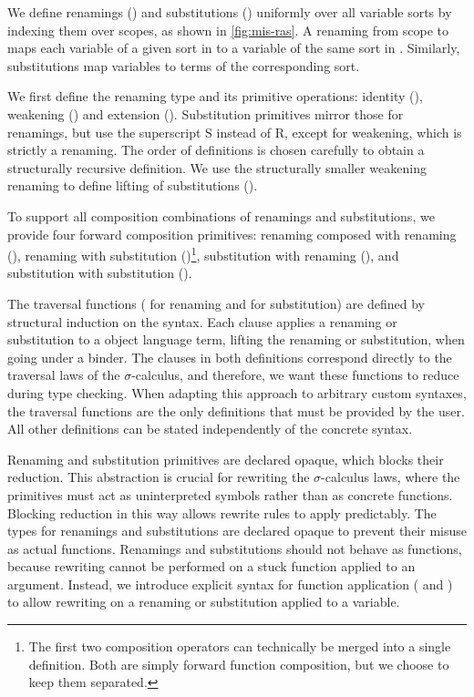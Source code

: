 \documentclass[screen,nonacm]{acmart}
\begin{document}
We define renamings () and substitutions
() uniformly over all variable sorts by indexing them over
scopes, as shown in \cref{fig:mis-ras}. A renaming from scope  to
 maps each variable of a given sort in  to a
variable of the same sort in . Similarly, substitutions map
variables to terms of the corresponding sort.

We first define the renaming type and its primitive operations: identity
(), weakening () and extension
(). Substitution primitives mirror those for renamings,
but use the superscript S instead of R, except for weakening, which is strictly
a renaming. The order of definitions is chosen carefully to obtain a
structurally recursive definition. We use the structurally smaller weakening
renaming to define lifting of substitutions ().

To support all composition combinations of renamings and substitutions, we
provide four forward composition primitives: renaming composed with renaming
(), renaming with substitution
()\footnote{The first two composition operators can
      technically be merged into a single definition. Both are simply forward
      function composition, but we choose to keep them separated.}, substitution with
renaming (), and substitution with substitution
().

The traversal functions ( for renaming and
 for substitution) are defined by structural induction on
the syntax. Each clause applies a renaming or substitution to a object language
term, lifting the renaming or substitution, when going under a binder. The
clauses in both definitions correspond directly to the traversal laws of the
$σ$-calculus, and therefore, we want these functions to reduce during type
checking. When adapting this approach to arbitrary custom syntaxes, the
traversal functions are the only definitions that must be provided by the user.
All other definitions can be stated independently of the concrete syntax.

Renaming and substitution primitives are declared opaque, which blocks their
reduction. This abstraction is crucial for rewriting the $σ$-calculus laws,
where the primitives must act as uninterpreted symbols rather than as concrete
functions. Blocking reduction in this way allows rewrite rules to apply
predictably. The types for renamings and substitutions are declared opaque to
prevent their misuse as actual functions. Renamings and substitutions should
not behave as functions, because rewriting cannot be performed on a stuck
function applied to an argument. Instead, we introduce explicit syntax for
function application ( and ) to
allow rewriting on a renaming or substitution applied to a variable.
\end{document}

